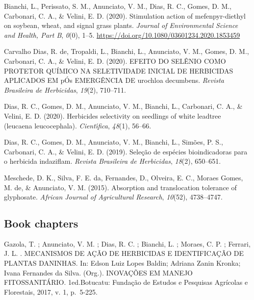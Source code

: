 \documentclass[11pt, a4paper]{awesome-cv}
\begin{document}
\leavevmode\hypertarget{ref-doi:10.1080ux2f03601234.2020.1853459}{}%
Bianchi, L., Perissato, S. M., Anunciato, V. M., Dias, R. C., Gomes, D.
M., Carbonari, C. A., \& Velini, E. D. (2020). Stimulation action of
mefenpyr-diethyl on soybean, wheat, and signal grass plants.
\emph{Journal of Environmental Science and Health, Part B}, \emph{0}(0),
1--5. \url{https://doi.org/10.1080/03601234.2020.1853459}

\leavevmode\hypertarget{ref-de2020efeito}{}%
Carvalho Dias, R. de, Tropaldi, L., Bianchi, L., Anunciato, V. M.,
Gomes, D. M., Carbonari, C. A., \& Velini, E. D. (2020). EFEITO DO
SEL{Ê}NIO COMO PROTETOR QU{Í}MICO NA SELETIVIDADE INICIAL DE HERBICIDAS
APLICADOS EM p{Ó}s EMERG{Ê}NCIA DE urochloa decumbens. \emph{Revista
Brasileira de Herbicidas}, \emph{19}(2), 710--711.

\leavevmode\hypertarget{ref-dias2020herbicides}{}%
Dias, R. C., Gomes, D. M., Anunciato, V. M., Bianchi, L., Carbonari, C.
A., \& Velini, E. D. (2020). Herbicides selectivity on seedlings of
white leadtree (leucaena leucocephala). \emph{Cient{ı́}fica},
\emph{48}(1), 56--66.

\leavevmode\hypertarget{ref-dias2019seleccao}{}%
Dias, R. C., Gomes, D. M., Anunciato, V. M., Bianchi, L., Simões, P. S.,
Carbonari, C. A., \& Velini, E. D. (2019). Sele{ç}{ã}o de esp{é}cies
bioindicadoras para o herbicida indaziflam. \emph{Revista Brasileira de
Herbicidas}, \emph{18}(2), 650--651.

\leavevmode\hypertarget{ref-meschede2015absorption}{}%
Meschede, D. K., Silva, F. E. da, Fernandes, D., Olveira, E. C., Moraes
Gomes, M. de, \& Anunciato, V. M. (2015). Absorption and translocation
tolerance of glyphosate. \emph{African Journal of Agricultural
Research}, \emph{10}(52), 4738--4747.

\endgroup

\hypertarget{book-chapters}{%
\subsection{Book chapters}\label{book-chapters}}

Gazola, T. ; Anunciato, V. M. ; Dias, R. C. ; Bianchi, L. ; Moraes, C.
P. ; Ferrari, J. L. . MECANISMOS DE AÇÃO DE HERBICIDAS E IDENTIFICAÇÃO
DE PLANTAS DANINHAS. In: Edson Luiz Lopes Baldin; Adriana Zanin Kronka;
Ivana Fernandes da Silva. (Org.). INOVAÇÕES EM MANEJO FITOSSANITÁRIO.
1ed.Botucatu: Fundação de Estudos e Pesquisas Agrícolas e Florestais,
2017, v. 1, p.~5-225.
\end{document}
